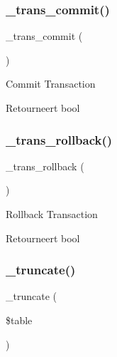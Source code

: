 \subsubsection{\texorpdfstring{\_trans\_commit()}{\_trans\_commit()}}
{\footnotesize\ttfamily \+\_\+trans\+\_\+commit (\begin{DoxyParamCaption}{ }\end{DoxyParamCaption})\hspace{0.3cm}{\ttfamily [protected]}}

Commit Transaction

\begin{DoxyReturn}{Retourneert}
bool 
\end{DoxyReturn}
\mbox{\label{class_c_i___d_b__oci8__driver_ad49a116b0776c26b53114c9093fd102a}} 
\subsubsection{\texorpdfstring{\_trans\_rollback()}{\_trans\_rollback()}}
{\footnotesize\ttfamily \+\_\+trans\+\_\+rollback (\begin{DoxyParamCaption}{ }\end{DoxyParamCaption})\hspace{0.3cm}{\ttfamily [protected]}}

Rollback Transaction

\begin{DoxyReturn}{Retourneert}
bool 
\end{DoxyReturn}
\mbox{\label{class_c_i___d_b__oci8__driver_aa029600528fc1ce660a23ff4b4667f95}} 
\subsubsection{\texorpdfstring{\_truncate()}{\_truncate()}}
{\footnotesize\ttfamily \+\_\+truncate (\begin{DoxyParamCaption}\item[{}]{\$table }\end{DoxyParamCaption})\hspace{0.3cm}{\ttfamily [protected]}}

